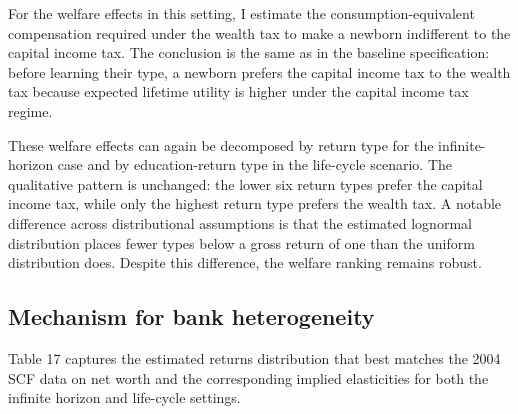 \unskip
\unskip

\par For the welfare effects in this setting, I estimate the consumption-equivalent compensation required under the wealth tax to make a newborn indifferent to the capital income tax. The conclusion is the same as in the baseline specification: before learning their type, a newborn prefers the capital income tax to the wealth tax because expected lifetime utility is higher under the capital income tax regime.



\par These welfare effects can again be decomposed by return type for the infinite-horizon case and by education-return type in the life-cycle scenario. The qualitative pattern is unchanged: the lower six return types prefer the capital income tax, while only the highest return type prefers the wealth tax. A notable difference across distributional assumptions is that the estimated lognormal distribution places fewer types below a gross return of one than the uniform distribution does. Despite this difference, the welfare ranking remains robust.





\FloatBarrier

\subsection{Mechanism for bank heterogeneity}

  \par Table 17 captures the estimated returns distribution that best matches the 2004 SCF data on net worth and the corresponding implied elasticities for both the infinite horizon and life-cycle settings.  

   
